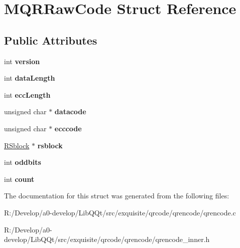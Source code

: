 \hypertarget{struct_m_q_r_raw_code}{}\section{M\+Q\+R\+Raw\+Code Struct Reference}
\label{struct_m_q_r_raw_code}
\subsection*{Public Attributes}
\begin{DoxyCompactItemize}
\item 
\mbox{\label{struct_m_q_r_raw_code_aafdd65b09fd50946f20a6aedd43e3632}} 
int {\bfseries version}
\item 
\mbox{\label{struct_m_q_r_raw_code_aef8d0f933df8def78c3c31062a77f5fe}} 
int {\bfseries data\+Length}
\item 
\mbox{\label{struct_m_q_r_raw_code_ac85c69963e0a9b261535d54af42d2c32}} 
int {\bfseries ecc\+Length}
\item 
\mbox{\label{struct_m_q_r_raw_code_ab5b3d0a075926a5c10e00a530c40fe57}} 
unsigned char $\ast$ {\bfseries datacode}
\item 
\mbox{\label{struct_m_q_r_raw_code_af3b715f02f1af9733ab7325122b7125e}} 
unsigned char $\ast$ {\bfseries ecccode}
\item 
\mbox{\label{struct_m_q_r_raw_code_acb157bddd9cb89851a78f43240d9f7b2}} 
\mbox{\hyperlink{struct_r_sblock}{R\+Sblock}} $\ast$ {\bfseries rsblock}
\item 
\mbox{\label{struct_m_q_r_raw_code_a47cf16f44a3c8a4f656a3245d154fa0c}} 
int {\bfseries oddbits}
\item 
\mbox{\label{struct_m_q_r_raw_code_ac8fe86012195e59a289bcf28df45360e}} 
int {\bfseries count}
\end{DoxyCompactItemize}


The documentation for this struct was generated from the following files\+:\begin{DoxyCompactItemize}
\item 
R\+:/\+Develop/a0-\/develop/\+Lib\+Q\+Qt/src/exquisite/qrcode/qrencode/qrencode.\+c\item 
R\+:/\+Develop/a0-\/develop/\+Lib\+Q\+Qt/src/exquisite/qrcode/qrencode/qrencode\+\_\+inner.\+h\end{DoxyCompactItemize}
